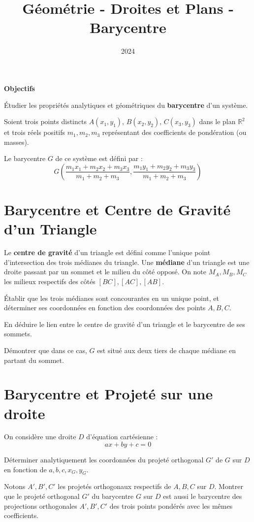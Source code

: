 \documentclass[10pt,a4paper]{article}
\title{Géométrie - Droites et Plans - Barycentre}
\author{}
\date{2024}
\begin{document}
\textbf{Objectifs}

Étudier les propriétés analytiques et géométriques du \textbf{barycentre} d'un système.

Soient trois points distincts $A(x_1, y_1)$, $B(x_2, y_2)$, $C(x_3, y_3)$ dans le plan
$\mathbb{R}^2$ et trois réels positifs $m_1, m_2, m_3$ représentant des coefficients de pondération
(ou masses).

Le barycentre $G$ de ce système est défini par :
$$
G \left( \frac{m_1 x_1 + m_2 x_2 + m_3 x_3}{m_1 + m_2 + m_3},
         \frac{m_1 y_1 + m_2 y_2 + m_3 y_3}{m_1 + m_2 + m_3} \right)
$$


\section{Barycentre et Centre de Gravité d'un Triangle}


Le \textbf{centre de gravité} d'un triangle est défini comme l'unique point d'intersection des trois
médianes du triangle.
Une \textbf{médiane} d'un triangle est une droite passant par un sommet et le milieu du côté
opposé. On note $M_A, M_B, M_C$ les milieux respectifs des côtés $[BC], [AC], [AB]$.

\q Établir que les trois médianes sont concourantes en un unique point, et déterminer ses
coordonnées en fonction des coordonnées des points $A, B, C$.

\q En déduire le lien entre le centre de gravité d'un triangle et le barycentre de ses sommets.

\q Démontrer que dans ce cas, $G$ est situé aux deux tiers de chaque médiane en partant du sommet.


\section{Barycentre et Projeté sur une droite}

On considère une droite $D$ d'équation cartésienne :
$$ax + by + c = 0$$

\q Déterminer analytiquement les coordonnées du projeté orthogonal $G'$ de $G$ sur $D$ en fonction
de $a, b, c, x_G, y_G$.

\q Notons $A', B', C'$ les projetés orthogonaux respectifs de $A, B, C$ sur $D$. Montrer que le
projeté orthogonal $G'$ du barycentre $G$ sur $D$ est aussi le barycentre des projections
orthogonales $A', B', C'$ des trois points pondérés avec les mêmes coefficients.
\end{document}
